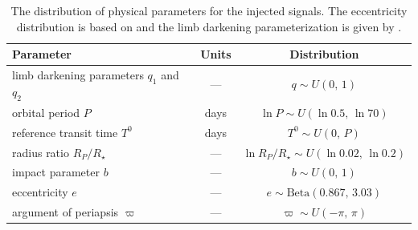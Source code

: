 \documentclass[12pt,preprint]{aastex}
\newcommand{\tablabel}[1]{\label{tab:#1}}
\newcommand{\period}{{\ensuremath{P}}}
\newcommand{\phase}{{\ensuremath{T^0}}}
\newcommand{\impact}{{\ensuremath{b}}}
\newcommand{\ecc}{{\ensuremath{e}}}
\newcommand{\pomega}{{\ensuremath{\varpi}}}
\begin{document}
\clearpage

\begin{table}[p]
\begin{center}
\begin{tabular}{lcc}
\toprule
Parameter & Units & Distribution \\
\midrule

limb darkening parameters $q_1$ and $q_2$ & --- & $q \sim U(0,\,1)$ \\
orbital period \period & days & $\ln \period \sim U(\ln 0.5,\,\ln 70)$ \\
reference transit time \phase & days & $\phase \sim U(0,\,\period)$ \\
radius ratio $R_P/R_\star$ & --- & $\ln R_P/R_\star \sim U(\ln 0.02,\,\ln 0.2)$ \\
impact parameter \impact & --- & $\impact \sim U(0,\,1)$ \\
eccentricity \ecc & --- & $\ecc \sim \mathrm{Beta}(0.867,\,3.03)$ \\
argument of periapsis \pomega & --- & $\pomega \sim U(-\pi,\,\pi)$ \\

\bottomrule
\end{tabular}
\end{center}
\caption{%
The distribution of physical parameters for the injected signals.
The eccentricity distribution is based on \citet{kipping-ecc} and the
limb darkening parameterization is given by \citet{kipping-ld}.
\tablabel{dist}}
\end{table}

\begin{table}[p]
\begin{center}
\small

\end{center}
\caption{%
Candidates
\tablabel{cand}}
\end{table}

\begin{table}[p]
\begin{center}

\end{center}
\caption{%
Probable binaries.
\tablabel{eb}}
\end{table}
\end{document}
